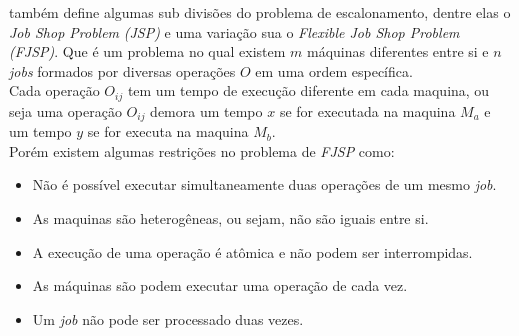 \citeauthor{Bagchi1999} também define algumas sub divisões do problema de escalonamento, dentre elas o \textit{Job Shop Problem} \textit{(JSP)} e uma variação sua o \textit{Flexible Job Shop Problem} \textit{(FJSP)}. 
Que é um problema no qual existem $m$ máquinas diferentes entre si e $n$ \textit{jobs} formados por diversas operações $O$ em uma ordem específica.\\
Cada operação $O_{ij}$ tem um tempo de execução diferente em cada maquina, ou seja uma operação 
$O_{ij}$ demora um tempo $x$ se for executada na maquina $M_a$ e um tempo $y$ se for executa na maquina $M_b$.\\
Porém existem algumas restrições no problema de \textit{FJSP} como:
\begin{itemize}
    \item Não é possível executar simultaneamente duas operações de um mesmo \textit{job}.
    \item As maquinas são heterogêneas, ou sejam, não são iguais entre si.
    \item A execução de uma operação é atômica e não podem ser interrompidas.
    \item As máquinas são podem executar uma operação de cada vez.
    \item Um \textit{job} não pode ser processado duas vezes.
\end{itemize}





